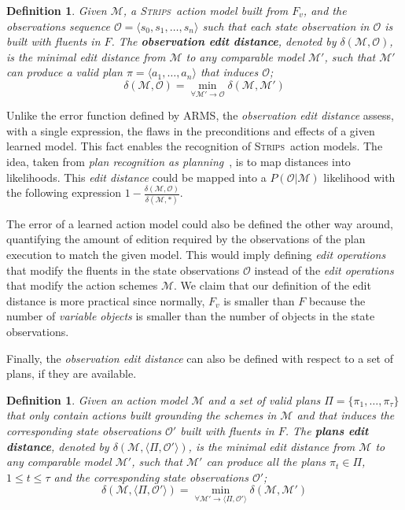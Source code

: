 \documentclass[3p,times]{elsarticle}
\newtheorem{mydefinition}[mytheorem]{Definition}
\newcommand{\strips}{\textsc{Strips}}     %
\newcommand{\tup}[1]{{\langle #1 \rangle}}
\begin{document}
\begin{mydefinition}
  Given $\mathcal{M}$, a \strips\ action model built from $F_v$, and the observations sequence $\mathcal{O}=\tup{s_0, s_1, \ldots, s_n}$ such that each state observation in $\mathcal{O}$ is built with fluents in $F$. The {\bf observation edit distance}, denoted by  $\delta(\mathcal{M},\mathcal{O})$, is the minimal edit distance from $\mathcal{M}$ to any {\em comparable} model $\mathcal{M}'$, such that $\mathcal{M}'$ can produce a valid plan $\pi=\tup{a_1, \ldots, a_n}$ that induces $\mathcal{O}$; \[\delta(\mathcal{M},\mathcal{O})=\min_{\forall \mathcal{M}' \rightarrow \mathcal{O}} \delta(\mathcal{M},\mathcal{M}')\]
\end{mydefinition}

Unlike the error function defined by {\sc ARMS}, the {\em observation edit distance} assess, with a single expression, the flaws in the preconditions and effects of a given learned model. This fact enables the recognition of \strips\ action models. The idea, taken from {\em plan recognition as planning}~\cite{ramirez2009plan}, is to map distances into likelihoods. This {\em edit distance} could be mapped into a $P(\mathcal{O}|\mathcal{M})$ likelihood with the following expression $1-\frac{\delta(\mathcal{M},\mathcal{O})}{\delta(\mathcal{M},*)}$.

The error of a learned action model could also be defined the other way around, quantifying the amount of edition required by the observations of the plan execution to match the given model. This would imply defining {\em edit operations} that modify the fluents in the state observations $\mathcal{O}$ instead of the {\em edit operations} that modify the action schemes $\mathcal{M}$. We claim that our definition of the edit distance is more practical since normally, $F_v$ is smaller than $F$ because the number of {\em variable objects} is smaller than the number of objects in the state observations.

Finally, the {\em observation edit distance} can also be defined with respect to a set of plans, if they are available. 
\begin{mydefinition}
  Given an action model $\mathcal{M}$ and a set of valid plans $\Pi=\{\pi_1,\ldots,\pi_{\tau}\}$ that only contain actions built grounding the schemes in $\mathcal{M}$ and that induces the corresponding state observations $\mathcal{O'}$ built with fluents in $F$. The {\bf plans edit distance}, denoted by  $\delta(\mathcal{M},\tup{\Pi,\mathcal{O'}})$, is the minimal edit distance from $\mathcal{M}$ to any {\em comparable} model $\mathcal{M}'$, such that $\mathcal{M}'$ can produce all the plans $\pi_t\in \Pi$, {\tt\small $1\leq t\leq \tau$} and the corresponding state observations $\mathcal{O'}$; \[\delta(\mathcal{M},\tup{\Pi,\mathcal{O'}})=\min_{\forall \mathcal{M}' \rightarrow \tup{\Pi,\mathcal{O'}}} \delta(\mathcal{M},\mathcal{M}')\]
\end{mydefinition}
\end{document}
